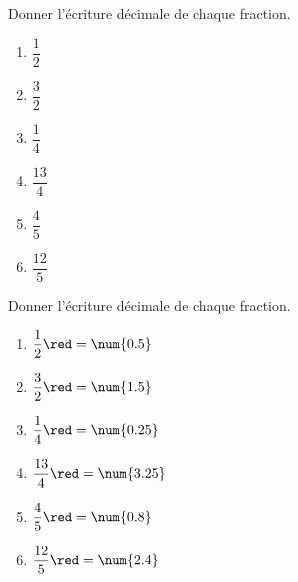\begin{exercice*}
    Donner l'écriture décimale de chaque fraction.
    \begin{multicols}{3}
        \begin{spacing}{1.5}
            \begin{enumerate}
                \item $\dfrac{1}{2}$
                \item $\dfrac{3}{2}$
                \item $\dfrac{1}{4}$
                \item $\dfrac{13}{4}$
                \item $\dfrac{4}{5}$
                \item $\dfrac{12}{5}$
            \end{enumerate}           
        \end{spacing}
    \end{multicols}
\end{exercice*}
\begin{corrige}
    Donner l'écriture décimale de chaque fraction.
    \begin{multicols}{3}
        \begin{spacing}{1.5}
            \begin{enumerate}
                \item $\dfrac{1}{2} {\red = \num{0.5}}$
                \item $\dfrac{3}{2} {\red = \num{1.5}}$
                \item $\dfrac{1}{4} {\red = \num{0.25}}$
                \item $\dfrac{13}{4}{\red = \num{3.25}}$
                \item $\dfrac{4}{5} {\red = \num{0.8}}$
                \item $\dfrac{12}{5}{\red = \num{2.4}}$
            \end{enumerate}           
        \end{spacing}
    \end{multicols}
\end{corrige}


